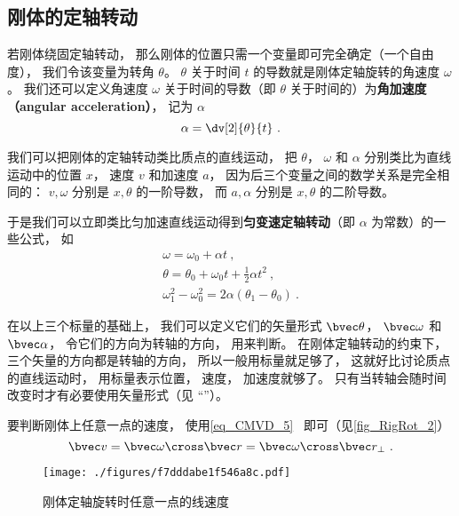 

\subsection{刚体的定轴转动}
若刚体绕固定轴转动， 那么刚体的位置只需一个变量即可完全确定（一个自由度）， 我们令该变量为转角 $\theta$。 $\theta$ 关于时间 $t$ 的导数就是刚体定轴旋转的角速度 $\omega$。 我们还可以定义角速度 $\omega$ 关于时间的导数（即 $\theta$ 关于时间的）为\textbf{角加速度（angular acceleration）}， 记为 $\alpha$
\begin{equation}
\alpha = \dv[2]{\theta}{t}~.
\end{equation}

我们可以把刚体的定轴转动类比质点的直线运动， 把 $\theta$， $\omega$ 和 $\alpha$ 分别类比为直线运动中的位置 $x$， 速度 $v$ 和加速度 $a$， 因为后三个变量之间的数学关系是完全相同的： $v, \omega$ 分别是 $x, \theta$ 的一阶导数， 而 $a, \alpha$ 分别是 $x, \theta$ 的二阶导数。

于是我们可以立即类比匀加速直线运动得到\textbf{匀变速定轴转动}（即 $\alpha$ 为常数）的一些公式， 如
\begin{gather}
\omega = \omega_0 + \alpha t~,\\
\theta = \theta_0 + \omega_0 t + \frac12 \alpha t^2~,\\
\omega_1^2 - \omega_0^2 = 2\alpha (\theta_1-\theta_0)~.
\end{gather}

在以上三个标量的基础上， 我们可以定义它们的矢量形式 $\bvec \theta$， $\bvec \omega$ 和 $\bvec \alpha$， 令它们的方向为转轴的方向， 用来判断。 在刚体定轴转动的约束下， 三个矢量的方向都是转轴的方向， 所以一般用标量就足够了， 这就好比讨论质点的直线运动时， 用标量表示位置， 速度， 加速度就够了。 只有当转轴会随时间改变时才有必要使用矢量形式（见 “”）。

要判断刚体上任意一点的速度， 使用\autoref{eq_CMVD_5}~ 即可（见\autoref{fig_RigRot_2}）
\begin{equation}
\bvec v = \bvec \omega \cross \bvec r = \bvec \omega \cross \bvec r_\bot~.
\end{equation}

\begin{figure}[ht]
\centering
\texttt{[image: ./figures/f7dddabe1f546a8c.pdf]}
\caption{刚体定轴旋转时任意一点的线速度} \label{fig_RigRot_2}
\end{figure}


